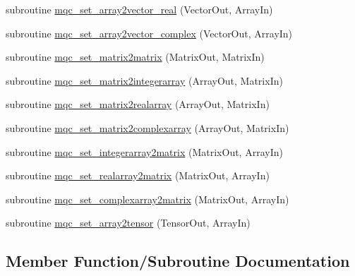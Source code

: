 \begin{DoxyCompactItemize}
\item 
subroutine \mbox{\hyperlink{interfacemqc__algebra_1_1assignment_07_0A_08_a671dc2d4504d6fad7e055673052f0dc0}{mqc\+\_\+set\+\_\+array2vector\+\_\+real}} (Vector\+Out, Array\+In)
\item 
subroutine \mbox{\hyperlink{interfacemqc__algebra_1_1assignment_07_0A_08_a7691df8ae425ea315de2d3e41e855cf7}{mqc\+\_\+set\+\_\+array2vector\+\_\+complex}} (Vector\+Out, Array\+In)
\item 
subroutine \mbox{\hyperlink{interfacemqc__algebra_1_1assignment_07_0A_08_ad3d9246331f2263ad2d8e00895d72472}{mqc\+\_\+set\+\_\+matrix2matrix}} (Matrix\+Out, Matrix\+In)
\item 
subroutine \mbox{\hyperlink{interfacemqc__algebra_1_1assignment_07_0A_08_a94e97f9845076db107ea3ad97f59d43a}{mqc\+\_\+set\+\_\+matrix2integerarray}} (Array\+Out, Matrix\+In)
\item 
subroutine \mbox{\hyperlink{interfacemqc__algebra_1_1assignment_07_0A_08_abeb0684ad9551afed5fbf4877518eb1e}{mqc\+\_\+set\+\_\+matrix2realarray}} (Array\+Out, Matrix\+In)
\item 
subroutine \mbox{\hyperlink{interfacemqc__algebra_1_1assignment_07_0A_08_a26dd52ed9adc201828577f8b70987466}{mqc\+\_\+set\+\_\+matrix2complexarray}} (Array\+Out, Matrix\+In)
\item 
subroutine \mbox{\hyperlink{interfacemqc__algebra_1_1assignment_07_0A_08_ac662f9faf887394ca66d5e1cea8866e2}{mqc\+\_\+set\+\_\+integerarray2matrix}} (Matrix\+Out, Array\+In)
\item 
subroutine \mbox{\hyperlink{interfacemqc__algebra_1_1assignment_07_0A_08_a3a212c363399d2a94f8d98cd678566c3}{mqc\+\_\+set\+\_\+realarray2matrix}} (Matrix\+Out, Array\+In)
\item 
subroutine \mbox{\hyperlink{interfacemqc__algebra_1_1assignment_07_0A_08_ac48436304280158dbdfcac59ccdd726c}{mqc\+\_\+set\+\_\+complexarray2matrix}} (Matrix\+Out, Array\+In)
\item 
subroutine \mbox{\hyperlink{interfacemqc__algebra_1_1assignment_07_0A_08_a440a7e41e61d8f9c391e48bc3c30fcbd}{mqc\+\_\+set\+\_\+array2tensor}} (Tensor\+Out, Array\+In)
\end{DoxyCompactItemize}


\subsection{Member Function/\+Subroutine Documentation}
\mbox{\label{interfacemqc__algebra_1_1assignment_07_0A_08_a7b6632609bbcd90b2baf561c9d0c6718}} 
